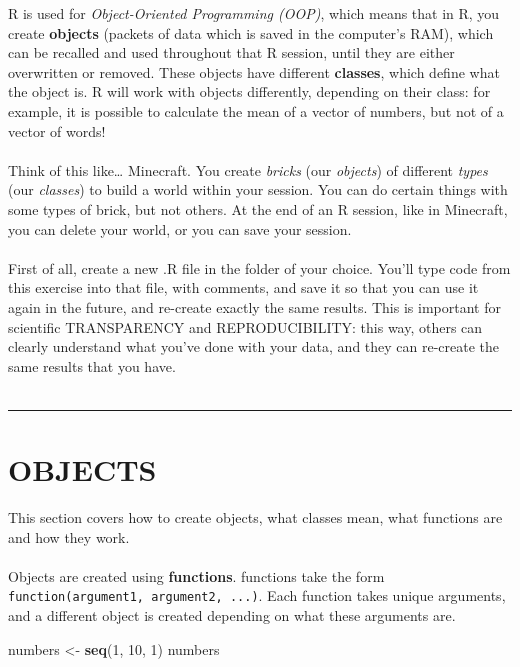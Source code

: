 \documentclass[
]{book}
\newenvironment{Shaded}{\begin{snugshade}}{\end{snugshade}}
\newcommand{\DecValTok}[1]{\textcolor[rgb]{0.00,0.00,0.81}{#1}}
\newcommand{\KeywordTok}[1]{\textcolor[rgb]{0.13,0.29,0.53}{\textbf{#1}}}
\newcommand{\NormalTok}[1]{#1}
\newcommand{\StringTok}[1]{\textcolor[rgb]{0.31,0.60,0.02}{#1}}
\begin{document}
R is used for \emph{Object-Oriented Programming (OOP)}, which means that in R, you
create \textbf{objects} (packets of data which is saved in the computer's RAM), which
can be recalled and used throughout that R session, until they are either
overwritten or removed. These objects have different \textbf{classes}, which define
what the object is. R will work with objects differently, depending on their
class: for example, it is possible to calculate the mean of a vector of numbers,
but not of a vector of words!\\
~\\

Think of this like\ldots{} Minecraft. You create \emph{bricks} (our \emph{objects})
of different \emph{types} (our \emph{classes}) to build a world within your session. You
can do certain things with some types of brick, but not others. At the
end of an R session, like in Minecraft, you can delete your world, or you can
save your session.\\
~\\

First of all, create a new .R file in the folder of your choice. You'll type
code from this exercise into that file, with comments, and save it so that
you can use it again in the future, and re-create exactly the same results.
This is important for scientific TRANSPARENCY and REPRODUCIBILITY: this
way, others can clearly understand what you've done with your data, and
they can re-create the same results that you have.\\
~\\

\begin{center}\rule{0.5\linewidth}{0.5pt}\end{center}

\hypertarget{objects}{%
\section{OBJECTS}\label{objects}}

This section covers how to create objects, what classes mean, what functions
are and how they work.\\
~\\

Objects are created using \textbf{functions}. functions take the form
\texttt{function(argument1,\ argument2,\ ...)}. Each function takes unique arguments,
and a different object is created depending on what these arguments are.

\begin{Shaded}
\begin{Highlighting}[]
\NormalTok{numbers <-}\StringTok{ }\KeywordTok{seq}\NormalTok{(}\DecValTok{1}\NormalTok{, }\DecValTok{10}\NormalTok{, }\DecValTok{1}\NormalTok{)}
\NormalTok{numbers}
\end{Highlighting}
\end{Shaded}
\end{document}
